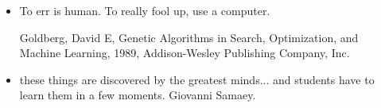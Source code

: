 \documentclass[../main/main.tex]{subfiles}
\begin{document}
\begin{itemize}
\item To err is human. To really fool up, use a computer.

Goldberg, David E, Genetic Algorithms in Search, Optimization, and Machine Learning, 1989, Addison-Wesley Publishing Company, Inc.


\item these things are discovered by the greatest minds... and students have to learn them in a few moments. Giovanni Samaey.

\end{itemize}
\end{document}
